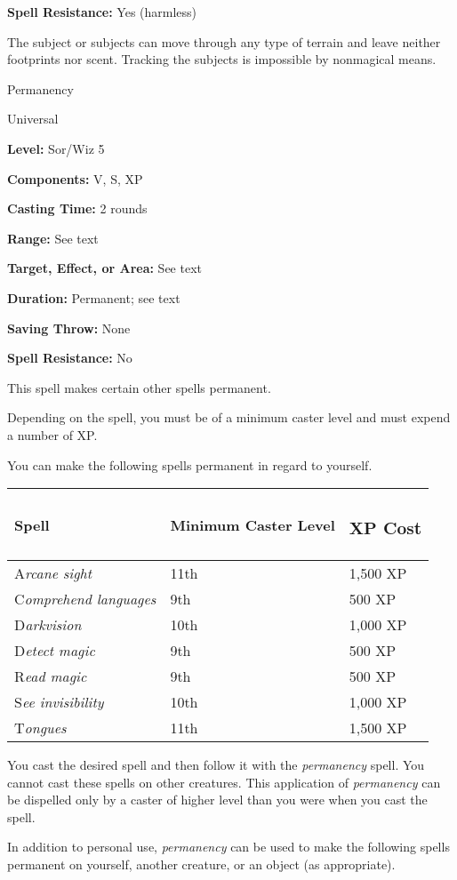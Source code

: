 \documentclass{article}
\begin{document}
\textbf{Spell Resistance:} Yes (harmless)

The subject or subjects can move through any type of terrain and leave neither 
footprints nor scent. Tracking the subjects is impossible by nonmagical means.

\vspace{12pt}
Permanency

Universal

\textbf{Level:} Sor/Wiz 5

\textbf{Components:} V, S, XP

\textbf{Casting Time:} 2 rounds

\textbf{Range:} See text

\textbf{Target, Effect, or Area: }See text

\textbf{Duration:} Permanent; see text

\textbf{Saving Throw:} None

\textbf{Spell Resistance:} No

This spell makes certain other spells permanent.

Depending on the spell, you must be of a minimum caster level and must expend a 
number of XP.

You can make the following spells permanent in regard to yourself.

\begin{tabular}{|>{\raggedright}p{98pt}|>{\raggedright}p{53pt}|>{\raggedright}p{41pt}|}
\hline
S\textbf{pell} & M\textbf{inimum Caster Level} & \subsubsection*{X\textbf{P Cost}}\tabularnewline
\hline
A\textit{rcane sight} & 11th & 1,500 XP\tabularnewline
\hline
C\textit{omprehend languages} & 9th & 500 XP\tabularnewline
\hline
D\textit{arkvision} & 10th & 1,000 XP\tabularnewline
\hline
D\textit{etect magic} & 9th & 500 XP\tabularnewline
\hline
R\textit{ead magic} & 9th & 500 XP\tabularnewline
\hline
S\textit{ee invisibility} & 10th & 1,000 XP\tabularnewline
\hline
T\textit{ongues} & 11th & 1,500 XP\tabularnewline
\hline
\end{tabular}

You cast the desired spell and then follow it with the \textit{permanency }spell. 
You cannot cast these spells on other creatures. This application of \textit{permanency 
}can be dispelled only by a caster of higher level than you were when you cast 
the spell.

In addition to personal use, \textit{permanency }can be used to make the following 
spells permanent on yourself, another creature, or an object (as appropriate).
\end{document}
